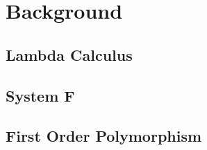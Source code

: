 \chapter{Background}\label{sec:background}

\section{Lambda Calculus}\label{sec:lambda-calc}
\section{System F}\label{sec:system-f}
\section{First Order Polymorphism}\label{sec:poly}
